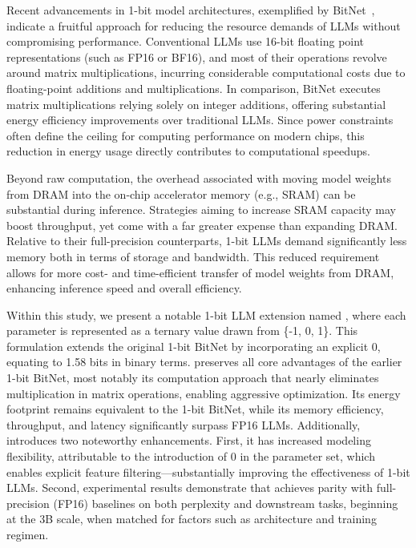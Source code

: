 Recent advancements in 1-bit model architectures, exemplified by BitNet~\cite{bitnet}, indicate a fruitful approach for reducing the resource demands of LLMs without compromising performance. Conventional LLMs use 16-bit floating point representations (such as FP16 or BF16), and most of their operations revolve around matrix multiplications, incurring considerable computational costs due to floating-point additions and multiplications. In comparison, BitNet executes matrix multiplications relying solely on integer additions, offering substantial energy efficiency improvements over traditional LLMs. Since power constraints often define the ceiling for computing performance on modern chips, this reduction in energy usage directly contributes to computational speedups.

Beyond raw computation, the overhead associated with moving model weights from DRAM into the on-chip accelerator memory (e.g., SRAM) can be substantial during inference. Strategies aiming to increase SRAM capacity may boost throughput, yet come with a far greater expense than expanding DRAM. Relative to their full-precision counterparts, 1-bit LLMs demand significantly less memory both in terms of storage and bandwidth. This reduced requirement allows for more cost- and time-efficient transfer of model weights from DRAM, enhancing inference speed and overall efficiency.

Within this study, we present a notable 1-bit LLM extension named \textbf{}, where each parameter is represented as a ternary value drawn from \{-1, 0, 1\}. This formulation extends the original 1-bit BitNet by incorporating an explicit 0, equating to 1.58 bits in binary terms.  preserves all core advantages of the earlier 1-bit BitNet, most notably its computation approach that nearly eliminates multiplication in matrix operations, enabling aggressive optimization. Its energy footprint remains equivalent to the 1-bit BitNet, while its memory efficiency, throughput, and latency significantly surpass FP16 LLMs. Additionally,  introduces two noteworthy enhancements. First, it has increased modeling flexibility, attributable to the introduction of 0 in the parameter set, which enables explicit feature filtering—substantially improving the effectiveness of 1-bit LLMs. Second, experimental results demonstrate that  achieves parity with full-precision (FP16) baselines on both perplexity and downstream tasks, beginning at the 3B scale, when matched for factors such as architecture and training regimen.

